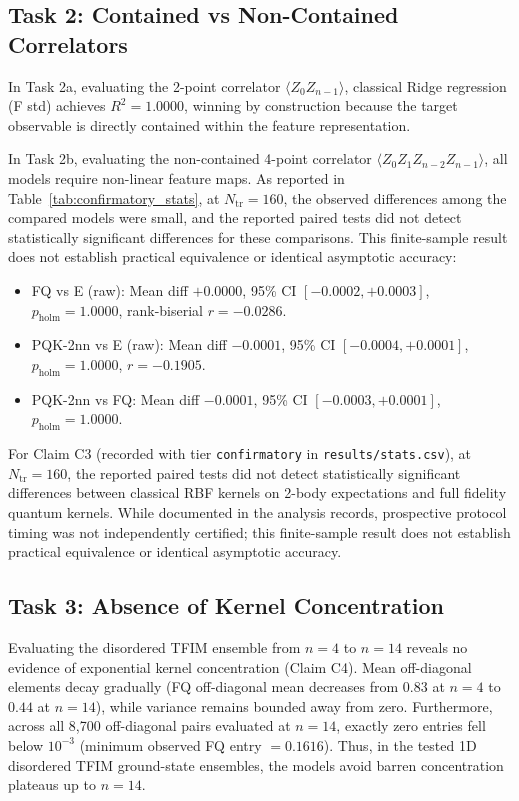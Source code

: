 \documentclass[conference]{IEEEtran}
\begin{document}
\subsection{Task 2: Contained vs Non-Contained Correlators}
In Task 2a, evaluating the 2-point correlator $\langle Z_0 Z_{n-1} \rangle$, classical Ridge regression (F std) achieves $R^2 = 1.0000$, winning by construction because the target observable is directly contained within the feature representation.

In Task 2b, evaluating the non-contained 4-point correlator $\langle Z_0 Z_1 Z_{n-2} Z_{n-1} \rangle$, all models require non-linear feature maps. As reported in Table~\ref{tab:confirmatory_stats}, at $N_{\text{tr}}=160$, the observed differences among the compared models were small, and the reported paired tests did not detect statistically significant differences for these comparisons. This finite-sample result does not establish practical equivalence or identical asymptotic accuracy:
\begin{itemize}
    \item FQ vs E (raw): Mean diff $+0.0000$, 95\% CI $[-0.0002, +0.0003]$, $p_{\text{holm}} = 1.0000$, rank-biserial $r = -0.0286$.
    \item PQK-2nn vs E (raw): Mean diff $-0.0001$, 95\% CI $[-0.0004, +0.0001]$, $p_{\text{holm}} = 1.0000$, $r = -0.1905$.
    \item PQK-2nn vs FQ: Mean diff $-0.0001$, 95\% CI $[-0.0003, +0.0001]$, $p_{\text{holm}} = 1.0000$.
\end{itemize}
For Claim C3 (recorded with tier \texttt{confirmatory} in \texttt{results/stats.csv}), at $N_{\mathrm{tr}}=160$, the reported paired tests did not detect statistically significant differences between classical RBF kernels on 2-body expectations and full fidelity quantum kernels. While documented in the analysis records, prospective protocol timing was not independently certified; this finite-sample result does not establish practical equivalence or identical asymptotic accuracy.

\subsection{Task 3: Absence of Kernel Concentration}
Evaluating the disordered TFIM ensemble from $n=4$ to $n=14$ reveals no evidence of exponential kernel concentration (Claim C4). Mean off-diagonal elements decay gradually (FQ off-diagonal mean decreases from $0.83$ at $n=4$ to $0.44$ at $n=14$), while variance remains bounded away from zero. Furthermore, across all 8,700 off-diagonal pairs evaluated at $n=14$, exactly zero entries fell below $10^{-3}$ (minimum observed FQ entry $= 0.1616$). Thus, in the tested 1D disordered TFIM ground-state ensembles, the models avoid barren concentration plateaus up to $n=14$.
\end{document}
